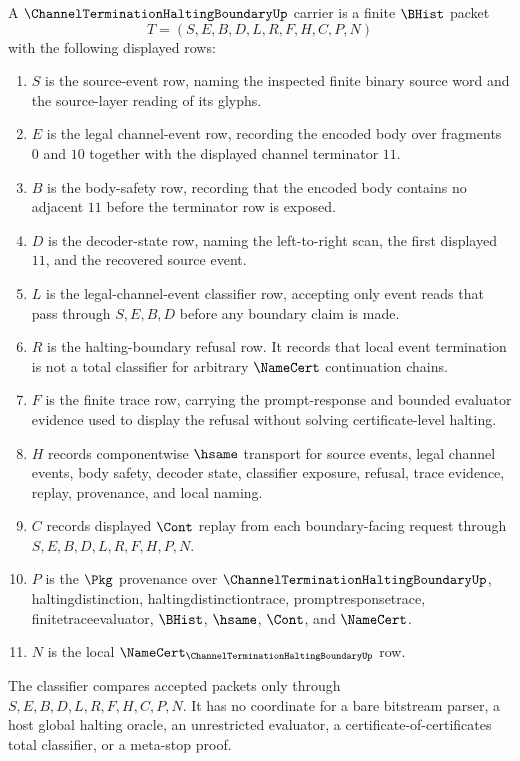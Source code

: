 \begin{definition}
\label{def:channel-termination-halting-boundary-carrier}
A $\ChannelTerminationHaltingBoundaryUp$ carrier is a finite $\BHist$ packet
$$
T=(S,E,B,D,L,R,F,H,C,P,N)
$$
with the following displayed rows:
\begin{enumerate}
\item $S$ is the source-event row, naming the inspected finite binary source word and the source-layer reading of its glyphs.
\item $E$ is the legal channel-event row, recording the encoded body over fragments $0$ and $10$ together with the displayed channel terminator $11$.
\item $B$ is the body-safety row, recording that the encoded body contains no adjacent $11$ before the terminator row is exposed.
\item $D$ is the decoder-state row, naming the left-to-right scan, the first displayed $11$, and the recovered source event.
\item $L$ is the legal-channel-event classifier row, accepting only event reads that pass through $S,E,B,D$ before any boundary claim is made.
\item $R$ is the halting-boundary refusal row. It records that local event termination is not a total classifier for arbitrary $\NameCert$ continuation chains.
\item $F$ is the finite trace row, carrying the prompt-response and bounded evaluator evidence used to display the refusal without solving certificate-level halting.
\item $H$ records componentwise $\hsame$ transport for source events, legal channel events, body safety, decoder state, classifier exposure, refusal, trace evidence, replay, provenance, and local naming.
\item $C$ records displayed $\Cont$ replay from each boundary-facing request through $S,E,B,D,L,R,F,H,P,N$.
\item $P$ is the $\Pkg$ provenance over $\ChannelTerminationHaltingBoundaryUp$, haltingdistinction, haltingdistinctiontrace, promptresponsetrace, finitetraceevaluator, $\BHist$, $\hsame$, $\Cont$, and $\NameCert$.
\item $N$ is the local $\NameCert_{\ChannelTerminationHaltingBoundaryUp}$ row.
\end{enumerate}
The classifier compares accepted packets only through $S,E,B,D,L,R,F,H,C,P,N$. It has no coordinate for a bare bitstream parser, a host global halting oracle, an unrestricted evaluator, a certificate-of-certificates total classifier, or a meta-stop proof.
\end{definition}

